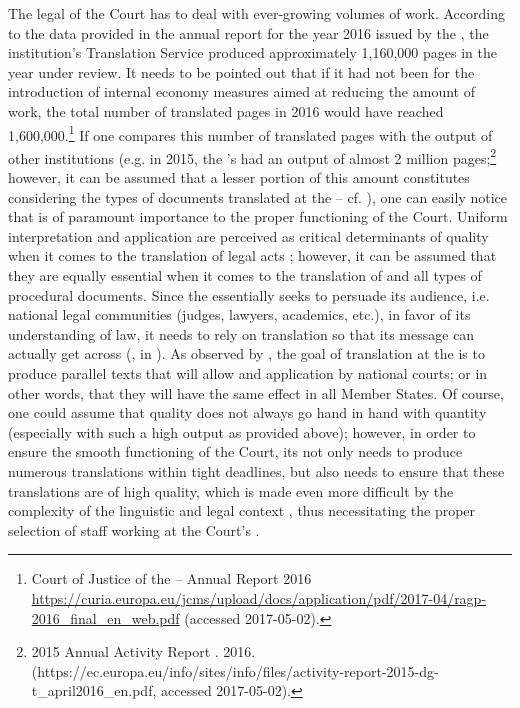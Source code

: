 \documentclass[output=paper]{langsci/langscibook}
\begin{document}
The legal  of the Court has to deal with ever-growing volumes of work. According to the data provided in the annual report for the year 2016 issued by the  \citep{ar2017}, the institution’s Translation Service produced approximately 1,160,000 pages in the year under review. It needs to be pointed out that if it had not been for the introduction of internal economy measures aimed at reducing the amount of work, the total number of translated pages in 2016 would have reached 1,600,000.\footnote{Court of Justice of the  – Annual Report 2016 \url{https://curia.europa.eu/jcms/upload/docs/application/pdf/2017-04/ragp-2016_final_en_web.pdf} (accessed 2017-05-02).} If one compares this number of translated pages with the output of other  institutions (e.g. in 2015, the ’s  had an output of almost 2 million pages;\footnote{2015 Annual Activity Report . 2016. (https://ec.europa.eu/info/sites/info/files/activity-report-2015-dg-t\_april2016\_en.pdf, accessed 2017-05-02).} however, it can be assumed that a lesser portion of this amount constitutes  considering the types of documents translated at the  – cf. \citealt{McAuliffe2012}), one can easily notice that  is of paramount importance to the proper functioning of the Court. Uniform interpretation and application are perceived as critical determinants of quality when it comes to the translation of legal acts \citep[73]{Šarčević1997}; however, it can be assumed that they are equally essential when it comes to the translation of  and all types of procedural documents. Since the  essentially seeks to persuade its audience, i.e. national legal communities (judges, lawyers, academics, etc.), in favor of its understanding of  law, it needs to rely on translation so that its message can actually get across (\citealt[85]{Łachacz2013}, in \citealt[296]{Paunio2007}). As observed by \citet[9]{McAuliffe2014}, the goal of translation at the  is to produce parallel texts that will allow  and application by national courts; or in other words, that they will have the same effect in all Member States. Of course, one could assume that quality does not always go hand in hand with quantity (especially with such a high output as provided above); however, in order to ensure the smooth functioning of the Court, its  not only needs to produce numerous translations within tight deadlines, but also needs to ensure that these translations are of high quality, which is made even more difficult by the complexity of the  linguistic and legal context \citep[69]{Kjær2007}, thus necessitating the proper selection of staff working at the Court’s .
\end{document}
